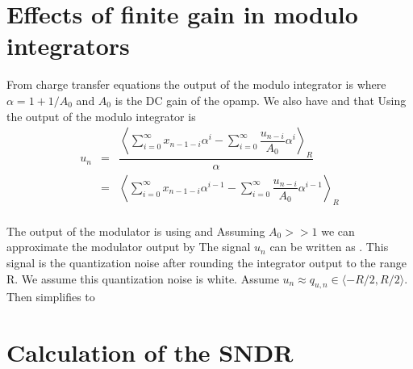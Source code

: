 \section{Effects of finite gain in modulo integrators}
\label{sdrap:finitegain}
From charge transfer equations the output of the modulo integrator is
where $\alpha  = 1+1/A_0$ and $A_0$ is the DC gain of the opamp. We
also have
and that
Using  the output of the modulo integrator is 
\setlength{\arraycolsep}{0.0em}
\begin{eqnarray}
\label{sdreq:apintout}
u_n &{}={}& \dfrac{\left \langle \sum_{i=0}^\infty{x_{n-1-i}\alpha^i} -
  \sum_{i=0}^\infty{\dfrac{u_{n-i}}{A_0}\alpha^i} \right \rangle_R}{\alpha}\nonumber\\
&{}={}& \left \langle \sum_{i=0}^\infty{x_{n-1-i}\alpha^{i-1}} -
  \sum_{i=0}^\infty{\dfrac{u_{n-i}}{A_0}\alpha^{i-1}} \right \rangle_R\nonumber\\
\end{eqnarray}
\setlength{\arraycolsep}{5pt}

The output of the modulator is 
using  and 
Assuming $A_0 >> 1$ we can approximate the modulator output by
The signal $u_n$  can be
written as . This signal is the quantization noise
after rounding the integrator output to the range R. We assume this
quantization noise is white. Assume $u_n \approx q_{u,n} \in \langle -R/2,
R/2 \rangle$. Then  simplifies to 

\section{Calculation of the SNDR}
\label{sdrap:sndr}

